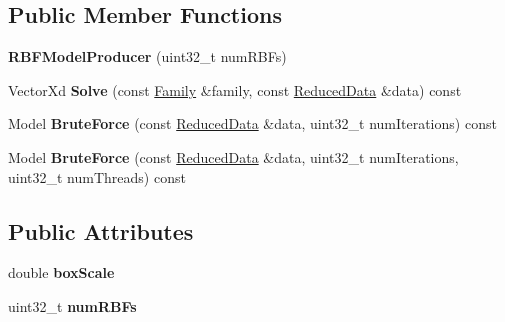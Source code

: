 \subsection*{Public Member Functions}
\begin{DoxyCompactItemize}
\item 
\hypertarget{struct_d_r_d_s_p_1_1_r_b_f_model_producer_abdbffa9162638d17b258fd2af9e867b1}{{\bfseries R\-B\-F\-Model\-Producer} (uint32\-\_\-t num\-R\-B\-Fs)}\label{struct_d_r_d_s_p_1_1_r_b_f_model_producer_abdbffa9162638d17b258fd2af9e867b1}

\item 
\hypertarget{struct_d_r_d_s_p_1_1_r_b_f_model_producer_a16280fd8b2c90a7f1781c36083a8eb8c}{Vector\-Xd {\bfseries Solve} (const \hyperlink{struct_d_r_d_s_p_1_1_family}{Family} \&family, const \hyperlink{struct_d_r_d_s_p_1_1_reduced_data}{Reduced\-Data} \&data) const }\label{struct_d_r_d_s_p_1_1_r_b_f_model_producer_a16280fd8b2c90a7f1781c36083a8eb8c}

\item 
\hypertarget{struct_d_r_d_s_p_1_1_r_b_f_model_producer_aaf6069ba29bae98424669eedaabd33c5}{Model {\bfseries Brute\-Force} (const \hyperlink{struct_d_r_d_s_p_1_1_reduced_data}{Reduced\-Data} \&data, uint32\-\_\-t num\-Iterations) const }\label{struct_d_r_d_s_p_1_1_r_b_f_model_producer_aaf6069ba29bae98424669eedaabd33c5}

\item 
\hypertarget{struct_d_r_d_s_p_1_1_r_b_f_model_producer_ad102d9f22c3052a72989f7725cffe687}{Model {\bfseries Brute\-Force} (const \hyperlink{struct_d_r_d_s_p_1_1_reduced_data}{Reduced\-Data} \&data, uint32\-\_\-t num\-Iterations, uint32\-\_\-t num\-Threads) const }\label{struct_d_r_d_s_p_1_1_r_b_f_model_producer_ad102d9f22c3052a72989f7725cffe687}

\end{DoxyCompactItemize}
\subsection*{Public Attributes}
\begin{DoxyCompactItemize}
\item 
\hypertarget{struct_d_r_d_s_p_1_1_r_b_f_model_producer_aca502a665ad3805c1e879dfa98966414}{double {\bfseries box\-Scale}}\label{struct_d_r_d_s_p_1_1_r_b_f_model_producer_aca502a665ad3805c1e879dfa98966414}

\item 
\hypertarget{struct_d_r_d_s_p_1_1_r_b_f_model_producer_a9734043452d4409fbe078ecad8299b33}{uint32\-\_\-t {\bfseries num\-R\-B\-Fs}}\label{struct_d_r_d_s_p_1_1_r_b_f_model_producer_a9734043452d4409fbe078ecad8299b33}

\end{DoxyCompactItemize}
